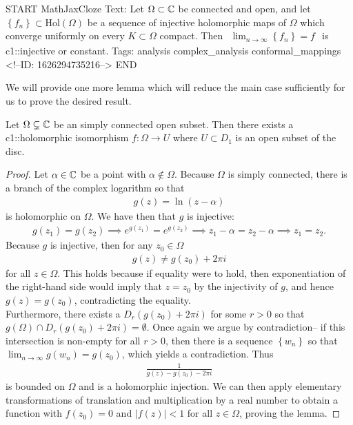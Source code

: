 \documentclass{memoir}
\begin{document}
\begin{anki}
START
MathJaxCloze
Text: Let \(\Omega \subset \mathbb{C}\) be connected and open, and let \(\left\{ f_n \right\} \subset \textrm{Hol}(\Omega )\) be a sequence of injective holomorphic maps of \(\Omega \) which converge uniformly on every \(K\subset \Omega \) compact. Then 
\(\begin{align*}
  	\lim_{n \to \infty} \left\{ f_n \right\} = f
  \end{align*}\)
is {{c1::injective or constant}}.
Tags: analysis complex_analysis conformal_mappings
<!--ID: 1626294735216-->
END
\end{anki}

We will provide one more lemma which will reduce the main case sufficiently for us to prove the desired result.

\begin{lemma}
	Let \(\Omega \subsetneq \mathbb{C}\) be an simply connected open subset. Then there exists a {{c1::holomorphic isomorphism}} \(f:\Omega \to U\) where \(U\subset D_1\) is an open subset of the disc.
\end{lemma}
\begin{proof}
	Let \(\alpha \in \mathbb{C}\) be a point with \(\alpha \not\in \Omega \). Because \(\Omega \) is simply connected, there is a branch of the complex logarithm so that
	\begin{align*}
		g(z) = \ln(z-\alpha )
	\end{align*}
	is holomorphic on \(\Omega \). We have then that \(g\) is injective:
	\begin{align*}
		g(z_1) = g(z_2) \implies e^{g(z_1)} = e^{g(z_2)} \implies z_1-\alpha  = z_2-\alpha \implies z_1=z_2.
	\end{align*}
	Because \(g\) is injective, then for any \(z_0 \in \Omega \)
	\begin{align*}
		g(z) \neq g(z_0) + 2\pi i
	\end{align*}
	for all \(z \in \Omega \). This holds because if equality were to hold, then exponentiation of the right-hand side would imply that \(z = z_0\) by the injectivity of \(g\), and hence \(g(z) = g(z_0)\), contradicting the equality.\\

	Furthermore, there exists a \(D_r(g(z_0)+2\pi i)\) for some \(r>0\) so that \(g(\Omega ) \cap D_r(g(z_0)+2\pi i) = \emptyset\). Once again we argue by contradiction-- if this intersection is non-empty for all \(r>0\), then there is a sequence \(\left\{ w_n \right\} \) so that \(\lim_{n \to \infty} g(w_n) = g(z_0)\), which yields a contradiction. Thus
	\begin{align*}
		\frac{1}{g(z) - g(z_0) - 2\pi i}
	\end{align*}
	is bounded on \(\Omega \) and is a holomorphic injection. We can then apply elementary transformations of translation and multiplication by a real number to obtain a function with \(f(z_0) = 0\) and \(\left| f(z) \right| <1\) for all \(z \in \Omega \), proving the lemma.
\end{proof}
\end{document}
